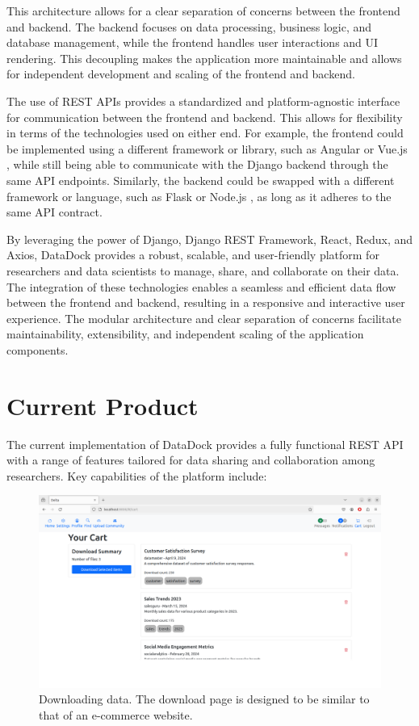 \documentclass[conference]{IEEEtran}
\begin{document}
This architecture allows for a clear separation of concerns between the frontend and backend. The backend focuses on data processing, business logic, and database management, while the frontend handles user interactions and UI rendering. This decoupling makes the application more maintainable and allows for independent development and scaling of the frontend and backend.

The use of REST APIs provides a standardized and platform-agnostic interface for communication between the frontend and backend. This allows for flexibility in terms of the technologies used on either end. For example, the frontend could be implemented using a different framework or library, such as Angular \cite{angular} or Vue.js \cite{vue}, while still being able to communicate with the Django backend through the same API endpoints. Similarly, the backend could be swapped with a different framework or language, such as Flask \cite{flask} or Node.js \cite{nodejs}, as long as it adheres to the same API contract.

By leveraging the power of Django, Django REST Framework, React, Redux, and Axios, DataDock provides a robust, scalable, and user-friendly platform for researchers and data scientists to manage, share, and collaborate on their data. The integration of these technologies enables a seamless and efficient data flow between the frontend and backend, resulting in a responsive and interactive user experience. The modular architecture and clear separation of concerns facilitate maintainability, extensibility, and independent scaling of the application components.
\section{Current Product}
The current implementation of DataDock provides a fully functional REST API with a range of features tailored for data sharing and collaboration among researchers. Key capabilities of the platform include:
\begin{figure}[h]
  \centering
  \includegraphics[width=\columnwidth]{figures/cart.png}
  \caption{Downloading data. The download page is designed to be similar to that of an e-commerce website.}
  \label{fig:delta-download}
\end{figure}
\end{document}
